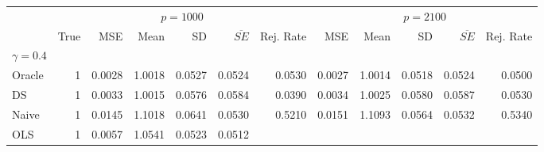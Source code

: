 \begin{tabular}{llllllllllll}
\cline{1-12}
\multicolumn{1}{c}{} &
  \multicolumn{6}{|c}{$ p = 1000 $} &
  \multicolumn{5}{c}{$ p = 2100 $} \\
\multicolumn{1}{c}{} &
  \multicolumn{1}{|r}{True} &
  \multicolumn{1}{r}{MSE} &
  \multicolumn{1}{r}{Mean} &
  \multicolumn{1}{r}{SD} &
  \multicolumn{1}{r}{$\overline{SE}$} &
  \multicolumn{1}{r}{Rej. Rate} &
  \multicolumn{1}{r}{MSE} &
  \multicolumn{1}{r}{Mean} &
  \multicolumn{1}{r}{SD} &
  \multicolumn{1}{r}{$\overline{SE}$} &
  \multicolumn{1}{r}{Rej. Rate} \\
\cline{1-12}
\multicolumn{1}{l}{$\gamma = 0.4$} &
  \multicolumn{1}{|r}{} &
  \multicolumn{1}{r}{} &
  \multicolumn{1}{r}{} &
  \multicolumn{1}{r}{} &
  \multicolumn{1}{r}{} &
  \multicolumn{1}{r}{} &
  \multicolumn{1}{r}{} &
  \multicolumn{1}{r}{} &
  \multicolumn{1}{r}{} &
  \multicolumn{1}{r}{} &
  \multicolumn{1}{r}{} \\
\multicolumn{1}{l}{\hspace{1em}Oracle} &
  \multicolumn{1}{|r}{1} &
  \multicolumn{1}{r}{0.0028} &
  \multicolumn{1}{r}{1.0018} &
  \multicolumn{1}{r}{0.0527} &
  \multicolumn{1}{r}{0.0524} &
  \multicolumn{1}{r}{0.0530} &
  \multicolumn{1}{r}{0.0027} &
  \multicolumn{1}{r}{1.0014} &
  \multicolumn{1}{r}{0.0518} &
  \multicolumn{1}{r}{0.0524} &
  \multicolumn{1}{r}{0.0500} \\
\multicolumn{1}{l}{\hspace{1em}DS} &
  \multicolumn{1}{|r}{1} &
  \multicolumn{1}{r}{0.0033} &
  \multicolumn{1}{r}{1.0015} &
  \multicolumn{1}{r}{0.0576} &
  \multicolumn{1}{r}{0.0584} &
  \multicolumn{1}{r}{0.0390} &
  \multicolumn{1}{r}{0.0034} &
  \multicolumn{1}{r}{1.0025} &
  \multicolumn{1}{r}{0.0580} &
  \multicolumn{1}{r}{0.0587} &
  \multicolumn{1}{r}{0.0530} \\
\multicolumn{1}{l}{\hspace{1em}Naive} &
  \multicolumn{1}{|r}{1} &
  \multicolumn{1}{r}{0.0145} &
  \multicolumn{1}{r}{1.1018} &
  \multicolumn{1}{r}{0.0641} &
  \multicolumn{1}{r}{0.0530} &
  \multicolumn{1}{r}{0.5210} &
  \multicolumn{1}{r}{0.0151} &
  \multicolumn{1}{r}{1.1093} &
  \multicolumn{1}{r}{0.0564} &
  \multicolumn{1}{r}{0.0532} &
  \multicolumn{1}{r}{0.5340} \\
\multicolumn{1}{l}{\hspace{1em}OLS} &
  \multicolumn{1}{|r}{1} &
  \multicolumn{1}{r}{0.0057} &
  \multicolumn{1}{r}{1.0541} &
  \multicolumn{1}{r}{0.0523} &
  \multicolumn{1}{r}{0.0512} &

\end{tabular}
